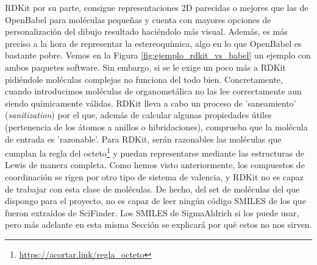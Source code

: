 RDKit por su parte, consigue representaciones 2D parecidas o mejores que las de OpenBabel para moléculas pequeñas y cuenta con mayores opciones de personalización del dibujo resultado \cite{rdkit_cookbook} haciéndolo más visual. Además, es más preciso a la hora de representar la estereoquímica, algo en lo que OpenBabel es bastante pobre. Vemos en la Figura \ref{fig:ejemplo_rdkit_vs_babel} un ejemplo con ambos paquetes software. Sin embargo, si se le exige un poco más a RDKit pidiéndole moléculas complejas no funciona del todo bien. Concretamente, cuando introducimos moléculas de organometálica no las lee correctamente aun siendo químicamente válidas. RDKit lleva a cabo un proceso de 'saneamiento' (\textit{sanitization}) \cite{rdkit_docbook} por el que, además de calcular algunas propiedades útiles (pertenencia de los átomos a anillos o hibridaciones), comprueba que la molécula de entrada es 'razonable'. Para RDKit, serán razonables las moléculas que cumplan la regla del octeto\footnote{\url{https://acortar.link/regla_octeto}} y puedan representarse mediante las estructuras de Lewis de manera completa. Como hemos visto anteriormente, los compuestos de coordinación se rigen por otro tipo de sistema de valencia, y RDKit no es capaz de trabajar con esta clase de moléculas. De hecho, del set de moléculas del que dispongo para el proyecto, no es capaz de leer ningún código SMILES de los que fueron extraídos de SciFinder. Los SMILES de SigmaAldrich si los puede usar, pero más adelante en esta misma Sección se explicará por qué estos no nos sirven.

